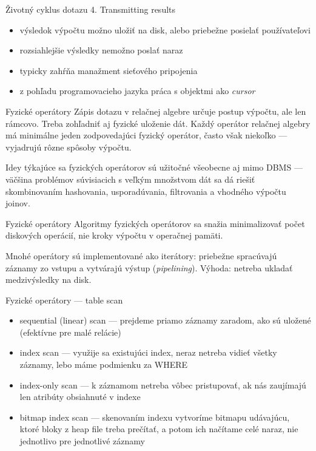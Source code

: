 \documentclass[12pt]{beamer}
\begin{document}
\begin{frame}[fragile]{Životný cyklus dotazu}
4. Transmitting results
\begin{itemize}
  \item výsledok výpočtu možno uložiť na disk, alebo priebežne posielať používateľovi
  \item rozsiahlejšie výsledky nemožno poslať naraz
  \item typicky zahŕňa manažment sieťového pripojenia
  \item z pohľadu programovacieho jazyka práca s objektmi ako \emph{cursor}
\end{itemize}
\end{frame}

\begin{frame}[fragile]{Fyzické operátory}
Zápis dotazu v relačnej algebre určuje postup výpočtu, ale len rámcovo.
Treba zohľadniť aj fyzické uloženie dát.
Každý operátor relačnej algebry má minimálne jeden zodpovedajúci fyzický operátor,
často však niekoľko --- vyjadrujú rôzne spôsoby výpočtu.
\bigskip

Idey týkajúce sa fyzických operátorov sú užitočné všeobecne aj mimo DBMS
--- väčšina problémov súvisiacich s veľkým množstvom dát sa dá riešiť
skombinovaním hashovania, usporadúvania, filtrovania a vhodného výpočtu joinov.
\end{frame}

\begin{frame}[fragile]{Fyzické operátory}
Algoritmy fyzických operátorov sa snažia minimalizovať počet diskových operácií,
nie kroky výpočtu v operačnej pamäti.
\bigskip

Mnohé operátory sú implementované ako iterátory:
priebežne spracúvajú záznamy zo vstupu a vytvárajú výstup (\emph{pipelining}).
Výhoda: netreba ukladať medzivýsledky na disk.
\end{frame}

\begin{frame}[fragile]{Fyzické operátory --- table scan}
\begin{itemize}
\item \alert{sequential (linear) scan} --- prejdeme priamo záznamy zaradom, ako sú uložené (efektívne pre malé relácie)
\item \alert{index scan} --- využije sa existujúci index, neraz netreba vidieť všetky záznamy, lebo máme podmienku za WHERE
\item \alert{index-only scan} --- k záznamom netreba vôbec pristupovať, ak nás zaujímajú len atribúty obsiahnuté v indexe
\item \alert{bitmap index scan} --- skenovaním indexu vytvoríme bitmapu udávajúcu, ktoré bloky z heap file treba prečítať, a potom ich načítame celé naraz, nie jednotlivo pre jednotlivé záznamy
\end{itemize}
\end{frame}
\end{document}
